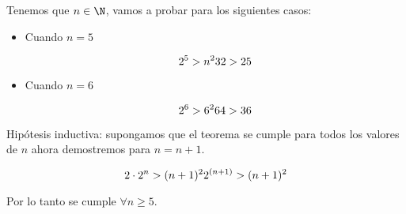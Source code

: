 \documentclass[]{article}
\begin{document}
Tenemos que \(n \in \N\), vamos a probar para los siguientes casos:

\begin{itemize}
\item
  Cuando \(n = 5\)

  \[2^5 > n^2 \\
  32 > 25\]
\item
  Cuando \(n = 6\)

  \[2^6 > 6^2 \\
  64 > 36\]
\end{itemize}

Hipótesis inductiva: supongamos que el teorema se cumple para todos los
valores de \(n\) ahora demostremos para \(n = n+1\).

\[2 \cdot 2^{n} > (n+1)^2 \\
2^{(n+1)} > (n+1)^2\]

Por lo tanto se cumple \(\forall n \ge 5 \).
\end{document}
